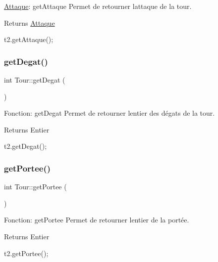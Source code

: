 \hyperlink{classAttaque}{Attaque}\+: get\+Attaque Permet de retourner l\textquotesingle{}attaque de la tour. 

\begin{DoxyReturn}{Returns}
\hyperlink{classAttaque}{Attaque} 
\begin{DoxyCode}
t2.getAttaque();
\end{DoxyCode}
 
\end{DoxyReturn}
\mbox{\label{classTour_a19e9adc634af6ed58dac224ade1986b8}} 
\subsubsection{\texorpdfstring{get\+Degat()}{getDegat()}}
{\footnotesize\ttfamily int Tour\+::get\+Degat (\begin{DoxyParamCaption}{ }\end{DoxyParamCaption})}



Fonction\+: get\+Degat Permet de retourner l\textquotesingle{}entier des dégats de la tour. 

\begin{DoxyReturn}{Returns}
Entier 
\begin{DoxyCode}
t2.getDegat();
\end{DoxyCode}
 
\end{DoxyReturn}
\mbox{\label{classTour_a4c0b40ef85678f12cc7a3e78588094e8}} 
\subsubsection{\texorpdfstring{get\+Portee()}{getPortee()}}
{\footnotesize\ttfamily int Tour\+::get\+Portee (\begin{DoxyParamCaption}{ }\end{DoxyParamCaption})}



Fonction\+: get\+Portee Permet de retourner l\textquotesingle{}entier de la portée. 

\begin{DoxyReturn}{Returns}
Entier 
\begin{DoxyCode}
t2.getPortee();
\end{DoxyCode}
 
\end{DoxyReturn}
\mbox{\label{classTour_a2283f61d6b088bf41c53c882f4a72864}} 
